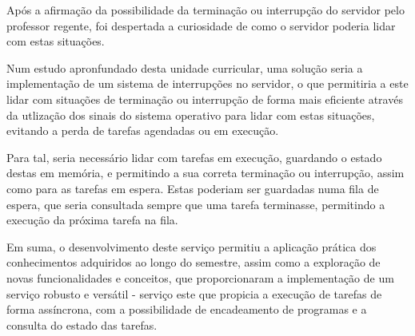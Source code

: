 \documentclass[a4paper,11pt]{scrreprt}
\begin{document}
    Após a afirmação da possibilidade da terminação ou interrupção do servidor
    pelo professor regente, foi despertada a curiosidade de como o servidor
    poderia lidar com estas situações.

    Num estudo apronfundado desta unidade curricular, uma solução seria a
    implementação de um sistema de interrupções no servidor, o que permitiria
    a este lidar com situações de terminação ou interrupção de forma mais
    eficiente através da utlização dos sinais do sistema operativo para lidar com estas
    situações, evitando a perda de tarefas agendadas ou em execução.

    Para tal, seria necessário lidar com tarefas em execução, guardando
    o estado destas em memória, e permitindo a sua correta terminação
    ou interrupção, assim como para as tarefas em espera. Estas poderiam
    ser guardadas numa fila de espera, que seria consultada sempre que
    uma tarefa terminasse, permitindo a execução da próxima tarefa na
    fila.

    Em suma, o desenvolvimento deste serviço permitiu a aplicação prática
    dos conhecimentos adquiridos ao longo do semestre, assim como a
    exploração de novas funcionalidades e conceitos, que proporcionaram
    a implementação de um serviço robusto e versátil - serviço este que 
    propicia a execução de tarefas de forma assíncrona, com a possibilidade de
    encadeamento de programas e a consulta do estado das tarefas.






\end{document}
